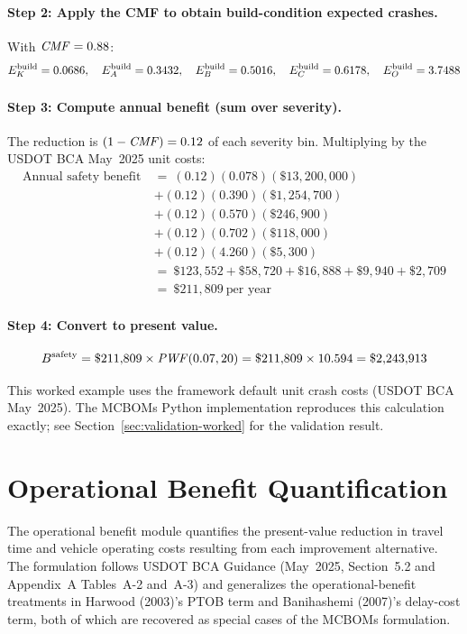 \paragraph{Step 2: Apply the CMF to obtain build-condition expected crashes.}
With $\mathit{CMF} = 0.88$:
\[
E^{\mathrm{build}}_K = 0.0686,\quad
E^{\mathrm{build}}_A = 0.3432,\quad
E^{\mathrm{build}}_B = 0.5016,\quad
E^{\mathrm{build}}_C = 0.6178,\quad
E^{\mathrm{build}}_O = 3.7488
\]

\paragraph{Step 3: Compute annual benefit (sum over severity).}
The reduction is $(1 - \mathit{CMF}) = 0.12$ of each severity bin. Multiplying by the
USDOT BCA May~2025 unit costs:
\begin{align*}
\text{Annual safety benefit} \ &=\ (0.12)(0.078)(\$13{,}200{,}000) \\
&+ (0.12)(0.390)(\$1{,}254{,}700) \\
&+ (0.12)(0.570)(\$246{,}900) \\
&+ (0.12)(0.702)(\$118{,}000) \\
&+ (0.12)(4.260)(\$5{,}300) \\
&=\ \$123{,}552 + \$58{,}720 + \$16{,}888 + \$9{,}940 + \$2{,}709 \\
&=\ \$211{,}809 \ \text{per year}
\end{align*}

\paragraph{Step 4: Convert to present value.}
\begin{equation*}
B^{\mathrm{safety}} = \$211{,}809 \times \mathit{PWF}(0.07, 20) = \$211{,}809 \times 10.594 = \$2{,}243{,}913
\end{equation*}

This worked example uses the framework default unit crash costs (USDOT BCA
May~2025). The MCBOMs Python implementation reproduces this calculation
exactly; see Section~\ref{sec:validation-worked} for the validation result.

\section{Operational Benefit Quantification}
\label{sec:ops}

The operational benefit module quantifies the present-value reduction in
travel time and vehicle operating costs resulting from each improvement
alternative. The formulation follows USDOT BCA Guidance (May~2025,
Section~5.2 and Appendix~A Tables~A-2 and~A-3) and generalizes the
operational-benefit treatments in Harwood (2003)'s PTOB term and
Banihashemi (2007)'s delay-cost term, both of which are recovered as special
cases of the MCBOMs formulation.

